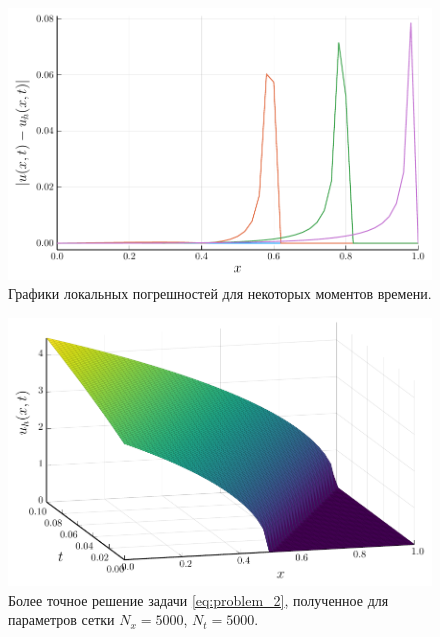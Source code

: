 \begin{figure}
    \centering
    \includegraphics{Разностные_схемы_на_статических_сетках/Программный_код_примеры_расчётов/explicit_scheme/problem_2_implicit_error_Samarski.pdf}
    \caption{Графики локальных погрешностей для некоторых моментов времени.}
    \label{fig:problem_2_implicit_error_Samarski}
\end{figure}
\begin{figure}
    \centering
    \includegraphics{Разностные_схемы_на_статических_сетках/Программный_код_примеры_расчётов/explicit_scheme/problem_2_implicit_surface_high.pdf}
    \caption{Более точное решение задачи \eqref{eq:problem_2}, полученное для параметров сетки $N_x = 5000$, $N_t = 5000$.}
    \label{fig:problem_2_implicit_surface_high}
\end{figure}

